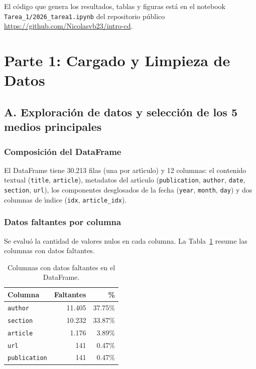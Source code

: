 \documentclass[11pt,a4paper]{article}
\begin{document}
El c\'{o}digo que genera los resultados, tablas y figuras est\'{a} en el notebook \texttt{Tarea\_1/2026\_tarea1.ipynb} del repositorio p\'{u}blico \url{https://github.com/Nicolasvb23/intro-cd}.

\section{Parte 1: Cargado y Limpieza de Datos}

\subsection{A. Exploraci\'{o}n de datos y selecci\'{o}n de los 5 medios principales}

\subsubsection*{Composici\'{o}n del DataFrame}

El DataFrame tiene 30.213 filas (una por art\'{\i}culo) y 12 columnas: el contenido textual (\texttt{title}, \texttt{article}), metadatos del art\'{\i}culo (\texttt{publication}, \texttt{author}, \texttt{date}, \texttt{section}, \texttt{url}), los componentes desglosados de la fecha (\texttt{year}, \texttt{month}, \texttt{day}) y dos columnas de \'{\i}ndice (\texttt{idx}, \texttt{article\_idx}).

\subsubsection*{Datos faltantes por columna}

Se evalu\'{o} la cantidad de valores nulos en cada columna. La Tabla~\ref{tab:missing} resume las columnas con datos faltantes.

\begin{table}[H]
\centering
\caption{Columnas con datos faltantes en el DataFrame.}
\label{tab:missing}
\begin{tabular}{l r r}
\toprule
\textbf{Columna} & \textbf{Faltantes} & \textbf{\%} \\
\midrule
\texttt{author} & 11.405 & 37.75\% \\
\texttt{section} & 10.232 & 33.87\% \\
\texttt{article} & 1.176 & 3.89\% \\
\texttt{url} & 141 & 0.47\% \\
\texttt{publication} & 141 & 0.47\% \\
\bottomrule
\end{tabular}
\end{table}
\end{document}
